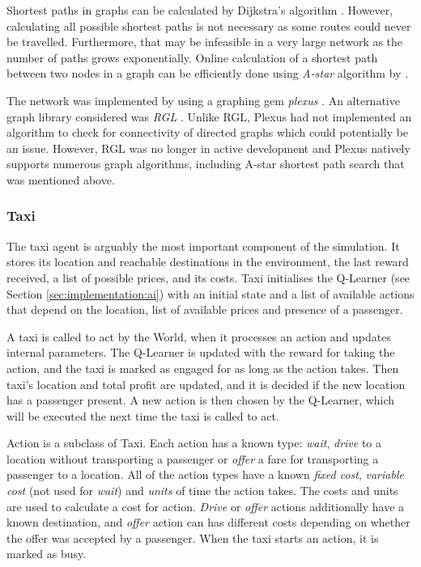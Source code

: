 Shortest paths in graphs can be calculated by Dijkstra's algorithm
\parencite{Cormen2009algorithms}. However, calculating all possible shortest
paths is not necessary as some routes could never be travelled. Furthermore,
that may be infeasible in a very large network as the number of paths grows
exponentially. Online calculation of a shortest path between two nodes in a
graph can be efficiently done using \textit{A-star} algorithm by
\textcite{Hart1968paths}.

The network was implemented by using a graphing gem \textit{plexus}
\parencite{Plexus}. An alternative graph library considered was \textit{RGL}
\parencite{Rgl}. Unlike RGL, Plexus had not implemented an algorithm to check
for connectivity of directed graphs which could potentially be an issue.
However, RGL was no longer in active development and Plexus natively supports
numerous graph algorithms, including A-star shortest path search that was
mentioned above.


\subsubsection{Taxi}
\label{sec:implementation:software:taxi}

The taxi agent is arguably the most important component of the simulation. It
stores its location and reachable destinations in the environment, the last
reward received, a list of possible prices, and its costs. Taxi initialises the
Q-Learner (see Section \ref{sec:implementation:ai}) with an initial state and a
list of available actions that depend on the location, list of available prices
and presence of a passenger.

A taxi is called to act by the World, when it processes an action and updates
internal parameters. The Q-Learner is updated with the reward for taking the
action, and the taxi is marked as engaged for as long as the action takes. Then
taxi's location and total profit are updated, and it is decided if the new
location has a passenger present. A new action is then chosen by the Q-Learner,
which will be executed the next time the taxi is called to act.

Action is a subclass of Taxi. Each action has a known type: \textit{wait},
\textit{drive} to a location without transporting a passenger or \textit{offer}
a fare for transporting a passenger to a location. All of the action types have
a known \textit{fixed cost}, \textit{variable cost} (not used for
\textit{wait}) and \textit{units} of time the action takes. The costs and units
are used to calculate a cost for action. \textit{Drive} or \textit{offer}
actions additionally have a known destination, and \textit{offer} action can
has different costs depending on whether the offer was accepted by a passenger.
When the taxi starts an action, it is marked as busy.

